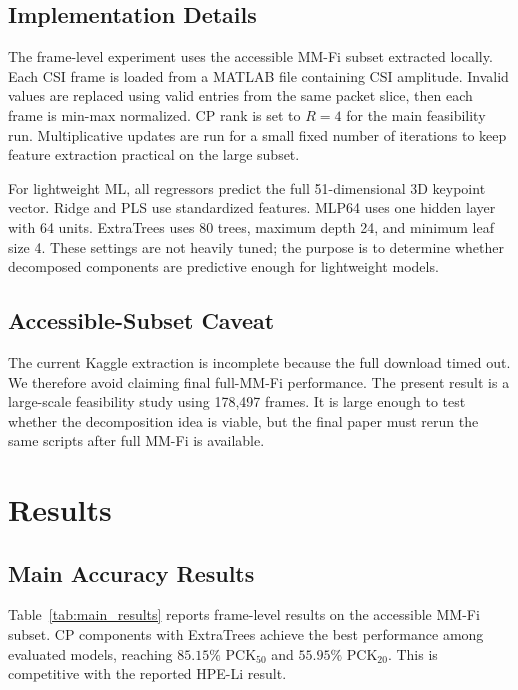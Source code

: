 \documentclass[letterpaper]{article}
\begin{document}
\subsection{Implementation Details}

The frame-level experiment uses the accessible MM-Fi subset extracted locally. Each CSI frame is loaded from a MATLAB file containing CSI amplitude. Invalid values are replaced using valid entries from the same packet slice, then each frame is min-max normalized. CP rank is set to $R=4$ for the main feasibility run. Multiplicative updates are run for a small fixed number of iterations to keep feature extraction practical on the large subset.

For lightweight ML, all regressors predict the full 51-dimensional 3D keypoint vector. Ridge and PLS use standardized features. MLP64 uses one hidden layer with 64 units. ExtraTrees uses 80 trees, maximum depth 24, and minimum leaf size 4. These settings are not heavily tuned; the purpose is to determine whether decomposed components are predictive enough for lightweight models.

\subsection{Accessible-Subset Caveat}

The current Kaggle extraction is incomplete because the full download timed out. We therefore avoid claiming final full-MM-Fi performance. The present result is a large-scale feasibility study using 178,497 frames. It is large enough to test whether the decomposition idea is viable, but the final paper must rerun the same scripts after full MM-Fi is available.

\section{Results}

\subsection{Main Accuracy Results}

Table~\ref{tab:main_results} reports frame-level results on the accessible MM-Fi subset. CP components with ExtraTrees achieve the best performance among evaluated models, reaching $85.15\%$ PCK$_{50}$ and $55.95\%$ PCK$_{20}$. This is competitive with the reported HPE-Li result.
\end{document}
